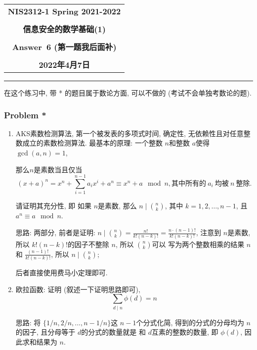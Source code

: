 \documentclass[a4paper,12pt]{ctexart}
\begin{document}
  \begin{center}

  \vspace{-0.3in}
  \begin{tabular}{c}
    \textbf{\Large NIS2312-1 Spring 2021-2022} \\
    \textbf{\Large  } \\
    \textbf{\Large  信息安全的数学基础(1)} \\
    \textbf{\Large  } \\
    \textbf{\Large  Answer~6 (第一题我后面补)} \\
    \textbf{\Large  } \\
    \textbf{\Large 2022年4月7日} \\
  \end{tabular}
  \end{center}
  \noindent
  \rule{\linewidth}{0.4pt}

  在这个练习中, 带 * 的题目属于数论方面, 可以不做的 (考试不会单独考数论的题).  
\subsubsection*{Problem *}
  \begin{enumerate}
    \item AKS素数检测算法, 第一个被发表的多项式时间, 确定性, 无依赖性且对任意整数成立的素数检测算法.
    最基本的原理: 一个整数 $ n $和整数 $ a $使得 $ \gcd(a,n)=1 $, 
    
    那么$ n $是素数当且仅当 
    \[ (x+a)^n=x^n+\sum_{i=1}^{n-1}a_ix^i +a^n\equiv x^n+a \mod{n},\text{其中所有的}~a_i~\text{均被}~n~\text{整除}. \]
    
    请证明其充分性, 即 如果 $ n $是素数, 那么 $ n\mid \binom{n}{k} $, 其中 $ k=1,2,\dots,n-1 $, 且 $ a^n\equiv a\mod{n} $.

    思路: 两部分, 前者是证明: $ n\mid \binom{n}{k}=\frac{n!}{k!(n-k)!}=\frac{n\cdot (n-1)!}{k!(n-k)!} $, 注意到 $ n $是素数, 所以 $ k!(n-k)! $的因子不整除 $ n $, 所以 $ \binom{n}{k} $可以
    写为两个整数相乘的结果 $ n $和 $ \frac{(n-1)!}{k!(n-k)!} $, 所以 $ n\mid \binom{n}{k} $;

    后者直接使用费马小定理即可.
    \item 欧拉函数: 证明 (叙述一下证明思路即可), \[\sum_{d\mid n}\phi(d)=n\]
    
    思路: 将 $ \{1/n,2/n,...,n-1/n\} $这 $ n-1 $个分式化简, 得到的分式的分母均为 $ n $的因子, 
    且分母等于 $ d $的分式的数量就是 和 $ d $互素的整数的数量, 即 $ \phi(d) $, 因此求和结果为 $ n $.
  \end{enumerate}    
\end{document}
